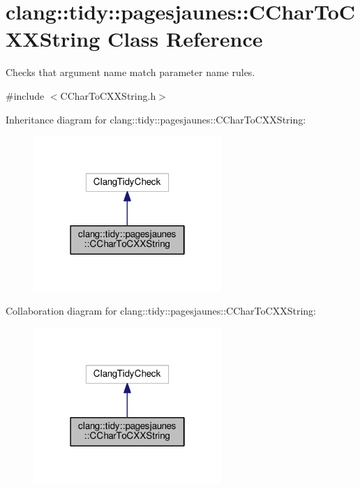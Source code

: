 \hypertarget{classclang_1_1tidy_1_1pagesjaunes_1_1_c_char_to_c_x_x_string}{}\section{clang\+:\+:tidy\+:\+:pagesjaunes\+:\+:C\+Char\+To\+C\+X\+X\+String Class Reference}
\label{classclang_1_1tidy_1_1pagesjaunes_1_1_c_char_to_c_x_x_string}


Checks that argument name match parameter name rules.  




{\ttfamily \#include $<$C\+Char\+To\+C\+X\+X\+String.\+h$>$}



Inheritance diagram for clang\+:\+:tidy\+:\+:pagesjaunes\+:\+:C\+Char\+To\+C\+X\+X\+String\+:
\nopagebreak
\begin{figure}[H]
\begin{center}
\leavevmode
\includegraphics[width=202pt]{classclang_1_1tidy_1_1pagesjaunes_1_1_c_char_to_c_x_x_string__inherit__graph}
\end{center}
\end{figure}


Collaboration diagram for clang\+:\+:tidy\+:\+:pagesjaunes\+:\+:C\+Char\+To\+C\+X\+X\+String\+:
\nopagebreak
\begin{figure}[H]
\begin{center}
\leavevmode
\includegraphics[width=202pt]{classclang_1_1tidy_1_1pagesjaunes_1_1_c_char_to_c_x_x_string__coll__graph}
\end{center}
\end{figure}

